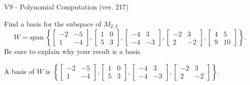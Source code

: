 \begin{exercise}
  \begin{exerciseTitle}V9 - Polynomial Computation (ver. 217)\end{exerciseTitle}
  \begin{exerciseStatement}
    Find a basis for the subspace of \(M_{2,2}\) 
\[W=\mathrm{span}\ \left\{\left[\begin{array}{cc}
-2 & -5 \\
1 & -4
\end{array}\right] , \left[\begin{array}{cc}
1 & 0 \\
5 & 3
\end{array}\right] , \left[\begin{array}{cc}
-4 & 3 \\
-4 & -3
\end{array}\right] , \left[\begin{array}{cc}
-2 & 3 \\
2 & -2
\end{array}\right] , \left[\begin{array}{cc}
4 & 5 \\
9 & 10
\end{array}\right]\right\}.\]
 Be sure to explain why your result is a basis.


  \end{exerciseStatement}
  \begin{exerciseAnswer}
   A basis of \(W\) is  \(\left\{\left[\begin{array}{cc}
-2 & -5 \\
1 & -4
\end{array}\right] , \left[\begin{array}{cc}
1 & 0 \\
5 & 3
\end{array}\right] , \left[\begin{array}{cc}
-4 & 3 \\
-4 & -3
\end{array}\right] , \left[\begin{array}{cc}
-2 & 3 \\
2 & -2
\end{array}\right]\right\}\).
  


  \end{exerciseAnswer}
\end{exercise}